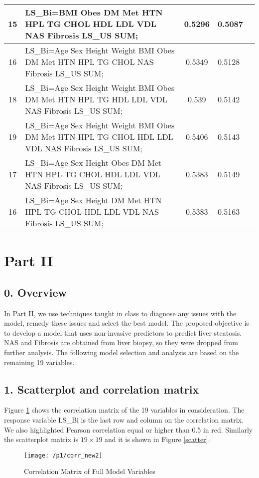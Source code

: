 \documentclass{article}
\begin{document}
\begin{minipage}{\textwidth}
{\begin{tabular}{ | c | l | c | l | c |}
	15  & LS\_Bi=BMI Obes DM Met HTN HPL TG CHOL HDL LDL VDL NAS Fibrosis LS\_US SUM;	&0.5296&	0.5087\\\hline
	16	& LS\_Bi=Age Sex Height Weight BMI Obes DM Met HTN HPL TG CHOL NAS Fibrosis LS\_US SUM;&	0.5349&	0.5128\\\hline
	18	& LS\_Bi=Age Sex Height Weight BMI Obes DM Met HTN HPL TG HDL LDL VDL NAS Fibrosis LS\_US SUM;&	0.539&	0.5142\\\hline
	19 & LS\_Bi=Age Sex Height Weight BMI Obes DM Met HTN HPL TG CHOL HDL LDL VDL NAS Fibrosis LS\_US SUM;	&0.5406	&0.5143\\\hline
	17	& LS\_Bi=Age Sex Height Obes DM Met HTN HPL TG CHOL HDL LDL VDL NAS Fibrosis LS\_US SUM;&	0.5383	&0.5149\\\hline
	16	& LS\_Bi=Age Sex Height DM Met HTN HPL TG CHOL HDL LDL VDL NAS Fibrosis LS\_US SUM;	&0.5383	&0.5163 \\
	\hline
	\end{tabular}
}
\end{minipage} \hfill
\section{Part II}
\subsection{0. Overview}
In Part II, we use techniques taught in class to diagnose any issues with the model, remedy these issues and select the best model. The proposed objective is to develop a model that uses non-invasive predictors to predict liver steatosis. NAS and Fibrosis are obtained from liver biopsy, so they were dropped from further analysis. The following model selection and analysis are based on the remaining 19 variables.

\subsection{1. Scatterplot and correlation matrix}
Figure \ref{corr} shows the correlation matrix of the 19 variables in consideration. The response variable LS\_Bi is the last row and column on the correlation matrix. We also highlighted Pearson correlation equal or higher than 0.5 in red. Similarly the scatterplot matrix is $19 \times 19$ and it is shown in Figure \ref{scatter}. \\
\begin{minipage}{\textwidth}		
\begin{figure}[H]
\centering
\texttt{[image: /p1/corr\_new2]}
\caption{Correlation Matrix of Full Model Variables}
\label{corr}
\end{figure}
\end{minipage}
\end{document}
